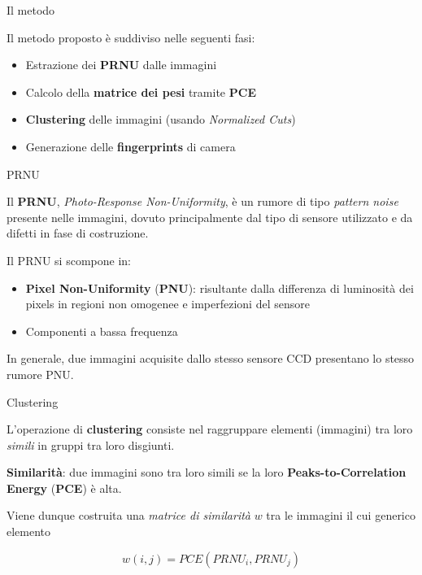 
\begin{tframe}{Il metodo}

\vspace{0.5cm}
Il metodo proposto è suddiviso nelle seguenti fasi:
\vspace{0.5cm}
\begin{itemize}
\item Estrazione dei \textbf{PRNU} dalle immagini
\vspace{0.5cm}
\item Calcolo della \textbf{matrice dei pesi} tramite \textbf{PCE}
\vspace{0.5cm}
\item \textbf{Clustering} delle immagini (usando \emph{Normalized Cuts})
\vspace{0.5cm}
\item Generazione delle \textbf{fingerprints} di camera
\end{itemize}
\end{tframe}


\begin{tframe}{PRNU}

Il \textbf{PRNU}, \emph{Photo-Response Non-Uniformity}, è un rumore di tipo \emph{pattern noise} presente nelle immagini, dovuto principalmente dal tipo di sensore utilizzato e da difetti in fase di costruzione.

\vspace{0.3cm}

Il PRNU si scompone in:
\vspace{0.5cm}
\begin{itemize}
\item \textbf{Pixel Non-Uniformity} (\textbf{PNU}): risultante dalla differenza di luminosità dei pixels in regioni non omogenee e imperfezioni del sensore
\item Componenti a bassa frequenza
\end{itemize}

\vspace{0.5cm}
In generale, due immagini acquisite dallo stesso sensore CCD presentano lo stesso rumore PNU.

\end{tframe}


\begin{tframe}{Clustering}

L'operazione di \textbf{clustering} consiste nel raggruppare elementi (immagini) tra loro \emph{simili} in gruppi tra loro disgiunti.

\vspace{0.5cm}

\textbf{Similarità}: due immagini sono tra loro simili se la loro \textbf{Peaks-to-Correlation Energy} (\textbf{PCE}) è alta.

\vspace{0.7cm}

Viene dunque costruita una \emph{matrice di similarità} $w$ tra le immagini il cui generico elemento

$$
w(i, j) = PCE(PRNU_i, PRNU_j)
$$

\end{tframe}

